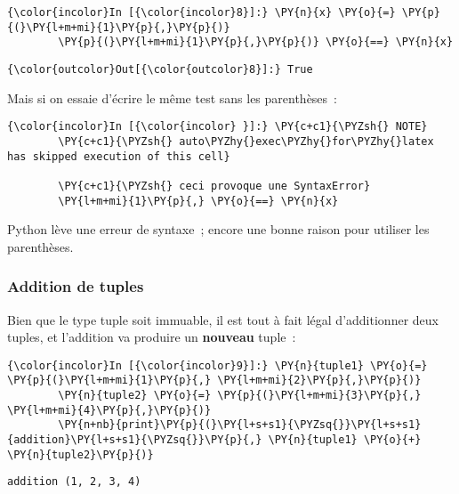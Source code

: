     \begin{Verbatim}[commandchars=\\\{\}]
{\color{incolor}In [{\color{incolor}8}]:} \PY{n}{x} \PY{o}{=} \PY{p}{(}\PY{l+m+mi}{1}\PY{p}{,}\PY{p}{)}
        \PY{p}{(}\PY{l+m+mi}{1}\PY{p}{,}\PY{p}{)} \PY{o}{==} \PY{n}{x}
\end{Verbatim}


\begin{Verbatim}[commandchars=\\\{\}]
{\color{outcolor}Out[{\color{outcolor}8}]:} True
\end{Verbatim}
            
    Mais si on essaie d'écrire le même test sans les parenthèses~:

    \begin{Verbatim}[commandchars=\\\{\}]
{\color{incolor}In [{\color{incolor} }]:} \PY{c+c1}{\PYZsh{} NOTE}
        \PY{c+c1}{\PYZsh{} auto\PYZhy{}exec\PYZhy{}for\PYZhy{}latex has skipped execution of this cell}
        
        \PY{c+c1}{\PYZsh{} ceci provoque une SyntaxError}
        \PY{l+m+mi}{1}\PY{p}{,} \PY{o}{==} \PY{n}{x}
\end{Verbatim}


    Python lève une erreur de syntaxe~; encore une bonne raison pour
utiliser les parenthèses.

    \hypertarget{addition-de-tuples}{%
\subsubsection{Addition de tuples}\label{addition-de-tuples}}

    Bien que le type tuple soit immuable, il est tout à fait légal
d'additionner deux tuples, et l'addition va produire un \textbf{nouveau}
tuple~:

    \begin{Verbatim}[commandchars=\\\{\}]
{\color{incolor}In [{\color{incolor}9}]:} \PY{n}{tuple1} \PY{o}{=} \PY{p}{(}\PY{l+m+mi}{1}\PY{p}{,} \PY{l+m+mi}{2}\PY{p}{,}\PY{p}{)}
        \PY{n}{tuple2} \PY{o}{=} \PY{p}{(}\PY{l+m+mi}{3}\PY{p}{,} \PY{l+m+mi}{4}\PY{p}{,}\PY{p}{)}
        \PY{n+nb}{print}\PY{p}{(}\PY{l+s+s1}{\PYZsq{}}\PY{l+s+s1}{addition}\PY{l+s+s1}{\PYZsq{}}\PY{p}{,} \PY{n}{tuple1} \PY{o}{+} \PY{n}{tuple2}\PY{p}{)}
\end{Verbatim}


    \begin{Verbatim}[commandchars=\\\{\}]
addition (1, 2, 3, 4)

    \end{Verbatim}

